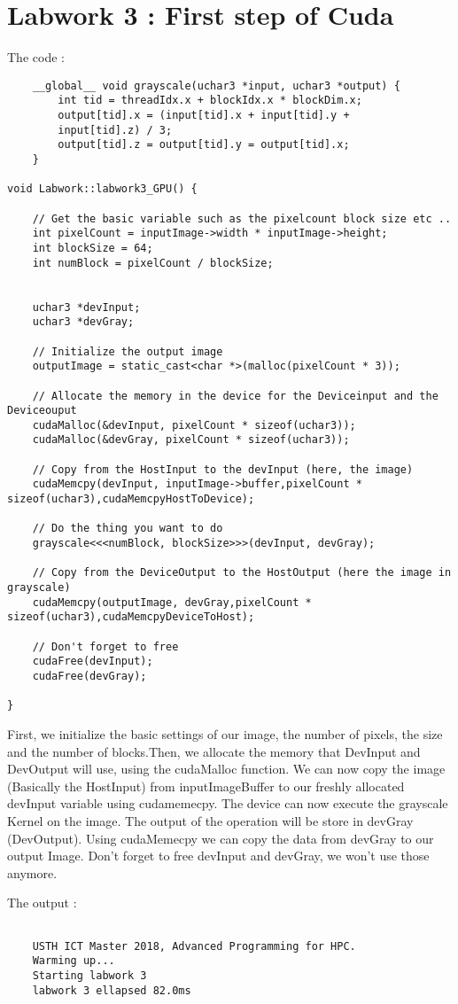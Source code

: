 \documentclass[paper=a4, fontsize=11pt]{scrartcl}
\begin{document}
\section{Labwork 3 : First step of Cuda}

    
    The code :
    \begin{verbatim}
    __global__ void grayscale(uchar3 *input, uchar3 *output) {
        int tid = threadIdx.x + blockIdx.x * blockDim.x;
        output[tid].x = (input[tid].x + input[tid].y +
        input[tid].z) / 3;
        output[tid].z = output[tid].y = output[tid].x;
    }
	
void Labwork::labwork3_GPU() {

	// Get the basic variable such as the pixelcount block size etc ..
	int pixelCount = inputImage->width * inputImage->height;
	int blockSize = 64;
	int numBlock = pixelCount / blockSize;

	
	uchar3 *devInput;
	uchar3 *devGray;
	
	// Initialize the output image
	outputImage = static_cast<char *>(malloc(pixelCount * 3));
	
	// Allocate the memory in the device for the Deviceinput and the Deviceouput
	cudaMalloc(&devInput, pixelCount * sizeof(uchar3));
	cudaMalloc(&devGray, pixelCount * sizeof(uchar3));
	
	// Copy from the HostInput to the devInput (here, the image)
	cudaMemcpy(devInput, inputImage->buffer,pixelCount * sizeof(uchar3),cudaMemcpyHostToDevice);
	
	// Do the thing you want to do
	grayscale<<<numBlock, blockSize>>>(devInput, devGray);
	
	// Copy from the DeviceOutput to the HostOutput (here the image in grayscale)
	cudaMemcpy(outputImage, devGray,pixelCount * sizeof(uchar3),cudaMemcpyDeviceToHost);
	
	// Don't forget to free
	cudaFree(devInput);
	cudaFree(devGray);

}
    \end{verbatim}
    
    First, we initialize the basic settings of our image, the number of pixels, the size and the number of blocks.Then, we allocate the memory that DevInput and DevOutput will use, using the cudaMalloc function. We can now copy the image (Basically the HostInput) from inputImageBuffer to our freshly allocated devInput variable using cudamemecpy. The device can now execute the grayscale Kernel on the image. The output of the operation will be store in devGray (DevOutput). Using cudaMemecpy we can copy the data from devGray to our output Image. Don't forget to free devInput and devGray, we won't use those anymore.\newline
    
    The output : 
    
    \begin{verbatim}
    
    USTH ICT Master 2018, Advanced Programming for HPC.
    Warming up...
    Starting labwork 3
    labwork 3 ellapsed 82.0ms

    \end{verbatim}
\end{document}
